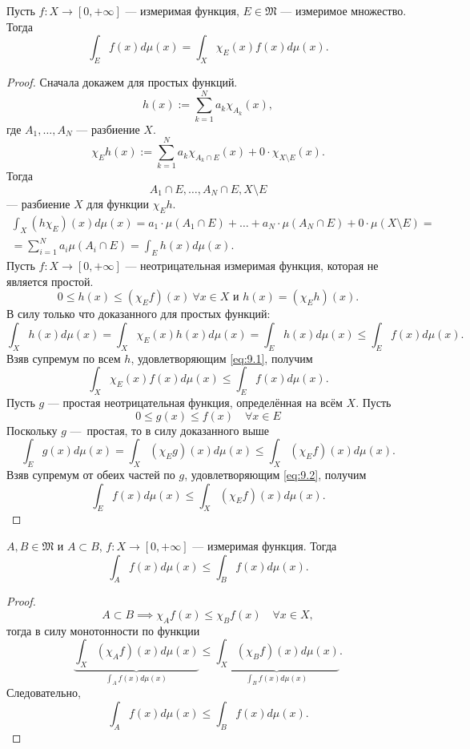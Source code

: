 \begin{statement}
    Пусть $f: X \to [0, +\infty]$ — измеримая функция,
    $E \in \mathfrak{M}$ — измеримое множество.
    Тогда
    \[\int_E f(x) d\mu(x) = \int_X \chi_E(x) f(x) d\mu(x).\]
\end{statement} 
\begin{proof}
    Сначала докажем для простых функций.
    $$h(x) := \sum\limits_{k=1}^{N} a_k \chi_{A_k}(x),$$
    где $A_1, \dots, A_N$ — разбиение $X$.
    \[\chi_E h(x) := \sum\limits_{k=1}^{N} a_k \chi_{A_k \cap E}(x) + 0 \cdot \chi_{X \setminus E}(x).\]
    Тогда
    \[A_1 \cap E, \dots, A_N \cap E, X \setminus E\]
    — разбиение $X$ для функции $\chi_E h$.
    \begin{multline*}
        \int_X (h \chi_E)(x) d\mu(x) 
        = a_1 \cdot \mu(A_1 \cap E) + \dots + a_N \cdot \mu(A_N \cap E) + 0 \cdot \mu(X \setminus E)
        =\\=
        \sum\limits_{i=1}^{N} a_i \mu(A_i \cap E)
        = \int_E h(x) d\mu(x).
    \end{multline*} 
    Пусть $f: X \to [0, +\infty]$ — неотрицательная измеримая функция, которая не является простой.
    \[0 \leqslant h(x) \leqslant (\chi_E f)(x) \ \forall x \in X
    \text{ и }
    h(x) = (\chi_E h)(x).\]
    В силу только что доказанного для простых функций:
    \[\int_X h(x) d\mu(x) 
    = \int_X \chi_E(x) h(x) d\mu(x)
    = \int_E h(x) d\mu(x)
    \leqslant \int_E f(x) d\mu(x).\]
    Взяв супремум по всем $h$, удовлетворяющим \eqref{eq:9.1}, получим
    \[\int_X \chi_E(x) f(x) d\mu(x) \leqslant \int_E f(x) d\mu(x).\]
    Пусть $g$ — простая неотрицательная функция, определённая на всём $X$.
    Пусть
    \begin{equation}
        0 \leqslant g(x) \leqslant f(x) \quad \forall x \in E \label{eq:9.2}
    \end{equation}
    Поскольку $g$ — простая, то в силу доказанного выше
    \[\int_E g(x) d\mu(x) 
    = \int_X (\chi_E g)(x) d\mu(x)
    \leqslant \int_X (\chi_E f)(x) d\mu(x).\]
    Взяв супремум от обеих частей по $g$, удовлетворяющим \eqref{eq:9.2}, получим
    \[\int_E f(x) d\mu(x) \leqslant \int_X (\chi_E f) (x) d\mu(x).\]
\end{proof} 

\begin{statement}
    $A,B \in \mathfrak{M}$ и $A \subset B$,
    $f: X \to [0, +\infty]$ — измеримая функция.
    Тогда
    \[\int_A f(x) d\mu(x) \leqslant \int_B f(x) d\mu(x).\]
\end{statement} 
\begin{proof}
    \[A \subset B
    \implies
    \chi_A f(x) \leqslant \chi_B f(x) \quad \forall x \in X,\]
    тогда в силу монотонности по функции
    \[\underbrace{\int_X (\chi_A f)(x) d\mu(x)}_{\int_A f(x) d\mu(x)} 
    \leqslant 
    \underbrace{\int_X (\chi_B f)(x) d\mu(x)}_{\int_B f(x) d\mu(x)}.\]
    Следовательно,
    \[\int_A f(x) d\mu(x) \leqslant \int_B f(x) d\mu(x).\]
\end{proof} 

